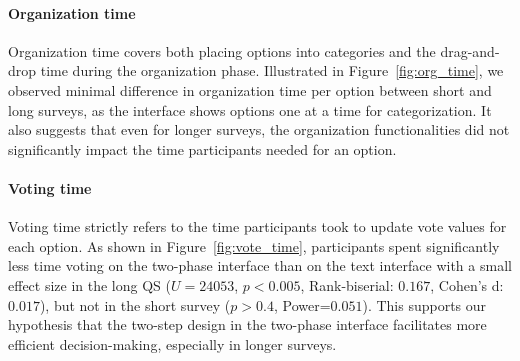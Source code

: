 \paragraph{Organization time} Organization time covers both placing options into categories and the drag-and-drop time during the organization phase. Illustrated in Figure~\ref{fig:org_time}, we observed minimal difference in organization time per option between short and long surveys, as the interface shows options one at a time for categorization. It also suggests that even for longer surveys, the organization functionalities did not significantly impact the time participants needed for an option.

\paragraph{Voting time} Voting time strictly refers to the time participants took to update vote values for each option. As shown in Figure~\ref{fig:vote_time}, participants spent significantly less time voting on the two-phase interface than on the text interface with a small effect size in the long QS ($U=24053$, $p<0.005$, Rank-biserial: $0.167$, Cohen's d: $0.017$), but not in the short survey ($p>0.4$, Power=$0.051$). This supports our hypothesis that the two-step design in the two-phase interface facilitates more efficient decision-making, especially in longer surveys.

% 

